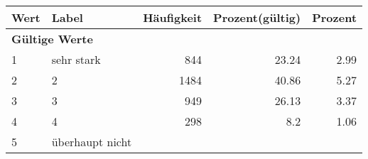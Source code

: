      \begin{longtable}{lXrrr}
     \toprule
     \textbf{Wert} & \textbf{Label} & \textbf{Häufigkeit} & \textbf{Prozent(gültig)} & \textbf{Prozent} \\
     \endhead
     \midrule
     \multicolumn{5}{l}{\textbf{Gültige Werte}}\\

     1 &
     \multicolumn{1}{X}{ sehr stark   } &


       \num{844} &
       \num[round-mode=places,round-precision=2]{23,24} &
         \num[round-mode=places,round-precision=2]{2,99} \\

     2 &
     \multicolumn{1}{X}{ 2   } &


       \num{1484} &
       \num[round-mode=places,round-precision=2]{40,86} &
         \num[round-mode=places,round-precision=2]{5,27} \\

     3 &
     \multicolumn{1}{X}{ 3   } &


       \num{949} &
       \num[round-mode=places,round-precision=2]{26,13} &
         \num[round-mode=places,round-precision=2]{3,37} \\

     4 &
     \multicolumn{1}{X}{ 4   } &


       \num{298} &
       \num[round-mode=places,round-precision=2]{8,2} &
         \num[round-mode=places,round-precision=2]{1,06} \\

     5 &
     \multicolumn{1}{X}{ überhaupt nicht   } &



\end{longtable}
